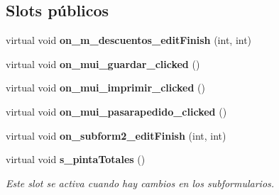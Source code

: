 \subsection*{Slots p\'{u}blicos}
\begin{CompactItemize}
\item 
virtual void {\bf on\_\-m\_\-descuentos\_\-edit\-Finish} (int, int)\label{classPresupuestoView_i0}

\item 
virtual void {\bf on\_\-mui\_\-guardar\_\-clicked} ()\label{classPresupuestoView_i1}

\item 
virtual void {\bf on\_\-mui\_\-imprimir\_\-clicked} ()\label{classPresupuestoView_i2}

\item 
virtual void {\bf on\_\-mui\_\-pasarapedido\_\-clicked} ()\label{classPresupuestoView_i3}

\item 
virtual void {\bf on\_\-subform2\_\-edit\-Finish} (int, int)\label{classPresupuestoView_i4}

\item 
virtual void {\bf s\_\-pinta\-Totales} ()\label{classPresupuestoView_i5}

\begin{CompactList}\small\item\em Este slot se activa cuando hay cambios en los subformularios. \item\end{CompactList}\end{CompactItemize}
